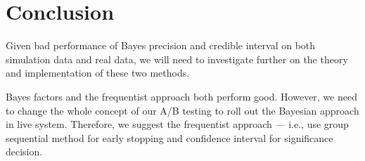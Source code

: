\documentclass[paper=a4, fontsize=11pt]{scrartcl} %
\numberwithin{equation}{section} %
\numberwithin{figure}{section} %
\numberwithin{table}{section} %
\begin{document}
\section{Conclusion}
Given bad performance of Bayes precision and credible interval on both simulation data and real data, we will need to investigate further on the theory and implementation of these two methods.

Bayes factors and the frequentist approach both perform good. However, we need to change the whole concept of our A/B testing to roll out the Bayesian approach in live system. Therefore, we suggest the frequentist approach --- i.e., use group sequential method for early stopping and confidence interval for significance decision.

\end{document}
